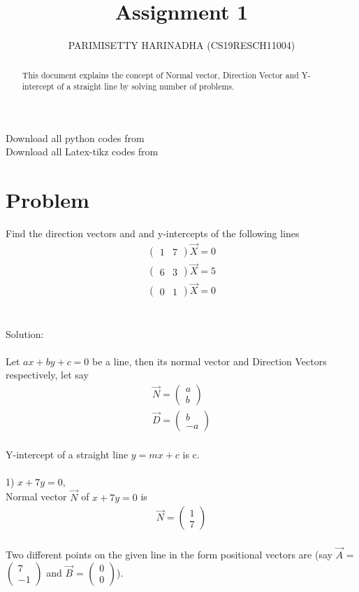 \documentclass[journal,12pt,twocolumn]{IEEEtran}
\title{Assignment 1}
\author{PARIMISETTY HARINADHA (CS19RESCH11004)}
\newcommand{\myvec}[1]{\ensuremath{\begin{pmatrix}#1\end{pmatrix}}}
\begin{document}
\maketitle
\newpage
\begin{abstract}
This document explains the concept of Normal vector, Direction Vector and Y-intercept of a straight line by solving number of problems.
\end{abstract}
Download all python codes from 
 \\
\newline
Download all Latex-tikz codes from 

\section{Problem}
Find the direction vectors and and y-intercepts of the following lines \\
\begin{align} 
    		\myvec{ 1 & 7 } \vec{X} =  0
\end{align}
\begin{align} 
    		\myvec{ 6 & 3 } \vec{X} =  5
\end{align}
\begin{align} 
    		\myvec{ 0 & 1 } \vec{X} =  0
\end{align}
\\
\\
Solution:\\
\\
Let $ ax+by+c=0 $ be a line, then its normal vector and Direction Vectors respectively, let say \begin{align}
	\vec{N} = \myvec{ a \\ b }\\
	\vec{D} = \myvec{ b \\ -a }
\end{align}
\\
Y-intercept of a straight line $ y = mx + c $ is c.
\\
\\
1) $ x  + 7y =  0,$
\\
Normal vector $\vec{N}$ of $ x  + 7y = 0 $ is   \begin{align}
	\vec{N} = \myvec{ 1 \\ 7 }
\end{align}
\\
	Two different points on the given line in the form positional vectors are (say $\vec{A}$ = \myvec{ 7 \\ -1 } and $\vec{B}$ = \myvec{ 0 \\ 0 }).\\
\end{document}
